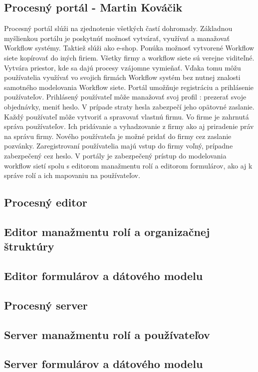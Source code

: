 \subsection{Procesný portál - Martin Kováčik}
Procesný portál slúži na zjednotenie všetkých častí dohromady. Základnou myšlienkou portálu je poskytnúť možnosť vytvárať, využívať a manažovať Workflow systémy. Taktiež slúži ako e-shop. Ponúka možnosť vytvorené Workflow siete kopírovať do iných firiem. Všetky firmy a workflow siete sú verejne viditeľné. Vytvára priestor, kde sa dajú procesy vzájomne vymieňať. Vďaka tomu môžu používatelia využívať vo svojich firmách Workflow systém bez nutnej znalosti samotného modelovania Workflow siete. Portál umožňuje registráciu a prihlásenie používateľov. Prihlásený používateľ  môže manažovať svoj profil : prezerať svoje objednávky, meniť heslo. V prípade straty hesla zabezpečí jeho opätovné zaslanie. Každý používateľ môže vytvoriť a spravovať vlastnú firmu. Vo firme je zahrnutá správa používateľov. Ich pridávanie a vyhadzovanie z firmy ako aj priradenie práv na správu firmy. Nového používateľa je možné pridať do firmy cez zaslanie pozvánky. Zaregistrovaní používatelia majú vstup do firmy voľný, prípadne zabezpečený cez heslo.  V portály je zabezpečený prístup do modelovania workflow sietí spolu s editorom manažmentu rolí a editorom formulárov, ako aj k správe rolí a ich mapovaniu na používateľov. 

\subsection{Procesný editor}
\subsection{Editor manažmentu rolí a organizačnej štruktúry}
\subsection{Editor formulárov a dátového modelu}
\subsection{Procesný server}
\subsection{Server manažmentu rolí a používateľov}
\subsection{Server formulárov a dátového modelu}

	


	

